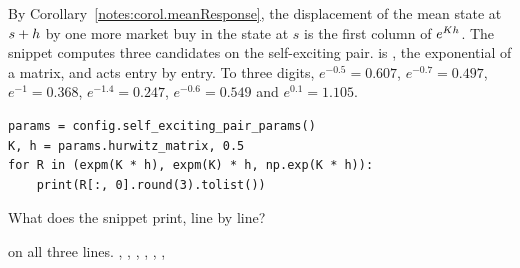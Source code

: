 \begin{question}
\label{question.expmOfKTimesTheHorizon}
By Corollary~\ref{notes:corol.meanResponse},
the displacement of the mean state at $s + h$
by one more market buy in the state at $s$
is the first column of $e^{K h}$.
The snippet computes three candidates on the self-exciting pair.
 is , the exponential of a matrix,
and  acts entry by entry.
To three digits,
$e^{-0.5} = 0.607$, $e^{-0.7} = 0.497$, $e^{-1} = 0.368$, $e^{-1.4} = 0.247$,
$e^{-0.6} = 0.549$ and $e^{0.1} = 1.105$.
\begin{lstlisting}[caption={Three exponentials at half a second}, label=listing.expmOfKTimesTheHorizon]
params = config.self_exciting_pair_params()
K, h = params.hurwitz_matrix, 0.5
for R in (expm(K * h), expm(K) * h, np.exp(K * h)):
    print(R[:, 0].round(3).tolist())
\end{lstlisting}
What does the snippet print, line by line?
\begin{choices}
 \choice \codehl{[0.552, 0.055]} on all three lines.
 \choice \codehl{[0.552, 0.055]}, \codehl{[0.552, 0.055]}, \codehl{[0.549, 1.105]}
 \correctchoice \codehl{[0.552, 0.055]}, \codehl{[0.154, 0.03]}, \codehl{[0.549, 1.105]}
 \choice \codehl{[0.552, 0.055]}, \codehl{[0.154, 0.03]}, \codehl{[0.552, 0.055]}
\end{choices}
\end{question}

